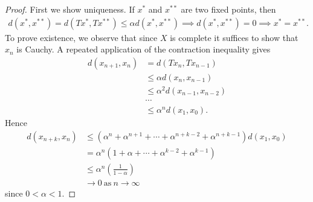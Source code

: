 \documentclass[12pt,reqno]{amsart}
\numberwithin{equation}{section}  %
\numberwithin{figure}{section}
\theoremstyle{plain}
\theoremstyle{definition}
\theoremstyle{remark}
\begin{document}
  \begin{proof} First we show uniqueness. If $x^*$ and $x^{**}$ are two fixed
	points, then
	\begin{equation*}
		\begin{split}
			d(x^*, x^{**}) = d(Tx^*, Tx^{**}) \le \alpha d(x^*, x^{**}) \implies d(x^*,
			x^{**}) = 0 \implies x^* = x^{**}.
		\end{split}
	\end{equation*}
To prove existence, we observe that since $X$ is complete it suffices to show
that $x_n$ is Cauchy. A repeated application of the
contraction inequality gives
%
%
\begin{equation*}
	\begin{split}
		d\left( x_{n+1},x_n \right)
		& = d\left( Tx_n, Tx_{n-1} \right)
		\\
		& \le \alpha d\left( x_n, x_{n-1} \right)
		\\
		& \le \alpha^2 d\left( x_{n-1}, x_{n-2} \right)
		\\
		& \cdots
		\\
		& \le \alpha^n d\left( x_1, x_0 \right).
	\end{split}
\end{equation*}
%
%
Hence
%
%
\begin{equation*}
\begin{split}
  d\left( x_{n+k},x_n \right)
  & \le (\alpha^{n } +\alpha^{n+1} + \cdots +
  \alpha^{n+k-2} + \alpha^{n+k-1})d(x_{1}, x_{0}) 
  \\
  & = \alpha^{n}(1 + \alpha + \cdots + \alpha^{k-2} + \alpha^{k-1})
  \\
  & \le \alpha^{n}\left( \frac{1}{1 - \alpha} \right)
  \\
  & \to 0 \ \text{as} \ n \to \infty
\end{split}
\end{equation*}
%
%
since $0 < \alpha < 1$. 
\end{proof}
%
%
%
%
%
%
%
\end{document}
